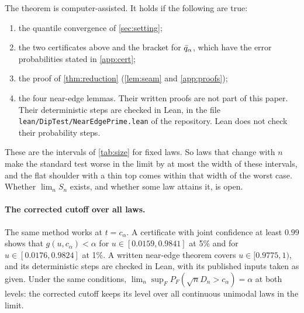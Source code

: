 \begin{remark}\label{rem:worst}
The theorem is computer-assisted. It holds if the following are true:
\begin{enumerate}[label=(\roman*),leftmargin=*,itemsep=2pt]
\item the quantile convergence of \cref{sec:setting};
\item the two certificates above and the bracket for $\bar q_\alpha$, which have the error probabilities stated in \cref{app:cert};
\item the proof of \cref{thm:reduction} (\cref{lem:seam} and \cref{app:proofs});
\item the four near-edge lemmas. Their written proofs are not part of this paper. Their deterministic steps are checked in Lean, in the file \texttt{lean/DipTest/NearEdgePrime.lean} of the repository. Lean does not check their probability steps.
\end{enumerate}
\end{remark}

These are the intervals of \cref{tab:size} for fixed laws. So laws that change with $n$ make the standard test worse in the limit by at most the width of these intervals, and the flat shoulder with a thin top comes within that width of the worst case. Whether $\lim_nS_n$ exists, and whether some law attains it, is open.

\paragraph{The corrected cutoff over all laws.} The same method works at $t=c_\alpha$. A certificate with joint confidence at least $0.99$ shows that $g(u,c_\alpha)<\alpha$ for $u\in[0.0159,0.9841]$ at 5\% and for $u\in[0.0176,0.9824]$ at 1\%. A written near-edge theorem covers $u\in[0.9775,1)$, and its deterministic steps are checked in Lean, with its published inputs taken as given. Under the same conditions, $\lim_n\sup_FP_F(\sqrt nD_n>c_\alpha)=\alpha$ at both levels: the corrected cutoff keeps its level over all continuous unimodal laws in the limit.
